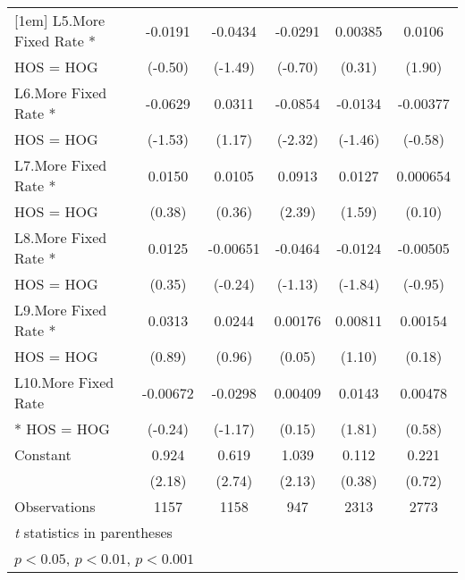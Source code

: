 {\begin{tabular}{l*{5}{c}}
[1em]
L5.More Fixed Rate *&     -0.0191         &     -0.0434         &     -0.0291         &     0.00385         &      0.0106         \\
HOS = HOG           &     (-0.50)         &     (-1.49)         &     (-0.70)         &      (0.31)         &      (1.90)         \\
[1em]
L6.More Fixed Rate *&     -0.0629         &      0.0311         &     -0.0854\sym{*}  &     -0.0134         &    -0.00377         \\
HOS = HOG           &     (-1.53)         &      (1.17)         &     (-2.32)         &     (-1.46)         &     (-0.58)         \\
[1em]
L7.More Fixed Rate *&      0.0150         &      0.0105         &      0.0913\sym{*}  &      0.0127         &    0.000654         \\
HOS = HOG           &      (0.38)         &      (0.36)         &      (2.39)         &      (1.59)         &      (0.10)         \\
[1em]
L8.More Fixed Rate *&      0.0125         &    -0.00651         &     -0.0464         &     -0.0124         &    -0.00505         \\
HOS = HOG           &      (0.35)         &     (-0.24)         &     (-1.13)         &     (-1.84)         &     (-0.95)         \\
[1em]
L9.More Fixed Rate *&      0.0313         &      0.0244         &     0.00176         &     0.00811         &     0.00154         \\
HOS = HOG           &      (0.89)         &      (0.96)         &      (0.05)         &      (1.10)         &      (0.18)         \\
[1em]
L10.More Fixed Rate &    -0.00672         &     -0.0298         &     0.00409         &      0.0143         &     0.00478         \\
* HOS = HOG         &     (-0.24)         &     (-1.17)         &      (0.15)         &      (1.81)         &      (0.58)         \\
[1em]
Constant            &       0.924\sym{*}  &       0.619\sym{**} &       1.039\sym{*}  &       0.112         &       0.221         \\
                    &      (2.18)         &      (2.74)         &      (2.13)         &      (0.38)         &      (0.72)         \\
\hline
Observations        &        1157         &        1158         &         947         &        2313         &        2773         \\
\hline\hline
\multicolumn{6}{l}{\footnotesize \textit{t} statistics in parentheses}\\
\multicolumn{6}{l}{\footnotesize \sym{*} \(p<0.05\), \sym{**} \(p<0.01\), \sym{***} \(p<0.001\)}\\
\end{tabular}
}
